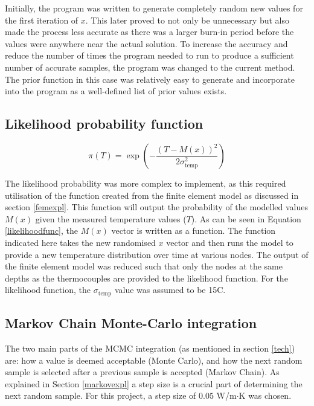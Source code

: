 Initially, the program was written to generate completely random new values for the first iteration of $x$. 
This later proved to not only be unnecessary but also made the process less accurate as there was a larger burn-in period before the values were anywhere near the actual solution.
To increase the accuracy and reduce the number of times the program needed to run to produce a sufficient number of accurate samples, the program was changed to the current method.
The prior function in this case was relatively easy to generate and incorporate into the program as a well-defined list of prior values exists.

	\subsection{Likelihood probability function}
		\begin{equation}
		\label{likelihoodfunc}
		\pi(T) = \exp\left(-\frac{\left(T-M(x)\right)^2}{2\sigma_{\text{temp}}^2}\right)
		\end{equation}
		
		The likelihood probability was more complex to implement, as this required utilisation of the function created from the finite element model as discussed in section \ref{femexpl}.
		This function will output the probability of the modelled values $M(x)$ given the measured temperature values ($T$).
		As can be seen in Equation \ref{likelihoodfunc}, the $M(x)$ vector is written as a function.
		The function indicated here takes the new randomised $x$ vector and then runs the model to provide a new temperature distribution over time at various nodes.
		The output of the finite element model was reduced such that only the nodes at the same depths as the thermocouples are provided to the likelihood function.
		For the likelihood function, the $\sigma_{\text{temp}}$ value was assumed to be 15\textdegree C.
		 

	\subsection{Markov Chain Monte-Carlo integration}\label{mcmcexp}
	The two main parts of the MCMC integration (as mentioned in section \ref{tech}) are: how a value is deemed acceptable (Monte Carlo), and how the next random sample is selected after a previous sample is accepted (Markov Chain).	
As explained in Section \ref{markovexpl} a step size is a crucial part of determining the next random sample.
	For this project, a step size of $0.05$ W/m$\cdot$K was chosen.

